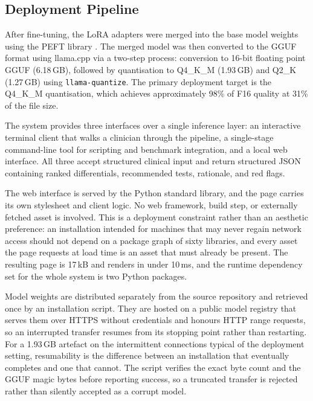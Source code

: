\documentclass[journal]{IEEEtran}
\begin{document}
\subsection{Deployment Pipeline}

After fine-tuning, the LoRA adapters were merged into the base
model weights using the PEFT library \cite{peft2023}. The merged
model was then converted to the GGUF format using llama.cpp
\cite{gerganov2023llamacpp} via a two-step process: conversion to
16-bit floating point GGUF (6.18\,GB), followed by quantisation
to Q4\_K\_M (1.93\,GB) and Q2\_K (1.27\,GB) using
\texttt{llama-quantize}. The primary deployment target is the
Q4\_K\_M quantisation, which achieves approximately 98\% of F16
quality at 31\% of the file size.

The system provides three interfaces over a single inference layer:
an interactive terminal client that walks a clinician through the
pipeline, a single-stage command-line tool for scripting and benchmark
integration, and a local web interface. All three accept structured
clinical input and return structured JSON containing ranked
differentials, recommended tests, rationale, and red flags.

The web interface is served by the Python standard library, and the
page carries its own stylesheet and client logic. No web framework,
build step, or externally fetched asset is involved. This is a
deployment constraint rather than an aesthetic preference: an
installation intended for machines that may never regain network access
should not depend on a package graph of sixty libraries, and every
asset the page requests at load time is an asset that must already be
present. The resulting page is 17\,kB and renders in under 10\,ms,
and the runtime dependency set for the whole system is two Python
packages.

Model weights are distributed separately from the source repository and
retrieved once by an installation script. They are hosted on a public
model registry that serves them over HTTPS without credentials and
honours HTTP range requests, so an interrupted transfer resumes from
its stopping point rather than restarting. For a 1.93\,GB artefact on
the intermittent connections typical of the deployment setting,
resumability is the difference between an installation that eventually
completes and one that cannot. The script verifies the exact byte count
and the GGUF magic bytes before reporting success, so a truncated
transfer is rejected rather than silently accepted as a corrupt
model.
\end{document}
